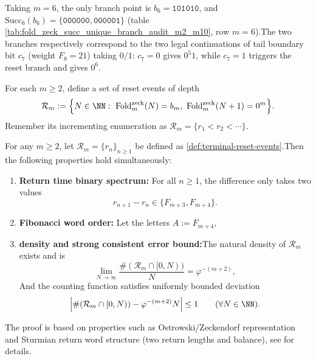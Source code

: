 \begin{enumerate}
\begin{remark}\label{rem:terminal-succ-m6-specialization}Taking \(m=6\), the only branch point is \(b_6=\texttt{101010}\), and\(\mathrm{Succ}_6(b_6)=\{\texttt{000000},\texttt{000001}\}\) (table \ref{tab:fold_zeck_succ_unique_branch_audit_m2_m10}, row \(m=6\)).The two branches respectively correspond to the two legal continuations of tail boundary bit \(c_7\) (weight \(F_8=21\)) taking \(0/1\): \(c_7=0\) gives \(0^{5}1\), while \(c_7=1\) triggers the reset branch and gives \(0^6\).  \end{remark}

\begin{definition}\label{def:terminal-reset-events}For each \(m\ge 2\), define a set of reset events of depth  \[
  \mathcal R_m
  :=\Bigl\{
  N\in\NN:\ \mathrm{Fold}^{\mathrm{zeck}}_m(N)=b_m,\ \mathrm{Fold}^{\mathrm{zeck}}_m(N+1)=0^m
  \Bigr\}.
  \]
Remember its incrementing enumeration as \(\mathcal R_m=\{r_1<r_2<\cdots\}\).  \end{definition}

\begin{theorem}\label{thm:terminal-reset-events-sturmian}For any \(m\ge 2\), let \(\mathcal R_m=\{r_n\}_{n\ge 1}\) be defined as \ref{def:terminal-reset-events}.Then the following properties hold simultaneously:  \begin{enumerate}
\item \textbf{Return time binary spectrum:} For all \(n\ge 1\), the difference only takes two values    \[
    r_{n+1}-r_n\in\{F_{m+3},F_{m+4}\}.
    \]
\item \textbf{Fibonacci word order:} Let the letters \(A:=F_{m+4}\),\item \textbf{density and strong consistent error bound:}The natural density of \(\mathcal R_m\) exists and is    \[
    \lim_{N\to\infty}\frac{\#(\mathcal R_m\cap[0,N))}{N}=\varphi^{-(m+2)},
    \]
And the counting function satisfies uniformly bounded deviation    \[
    \Bigl|\#(\mathcal R_m\cap[0,N))-\varphi^{-(m+2)}N\Bigr|\le 1\qquad(\forall N\in\NN).
    \]
  \end{enumerate}
The proof is based on properties such as Ostrowski/Zeckendorf representation and Sturmian return word structure (two return lengths and balance), see \cite{MorseHedlund1940,LindMarcus1995,Slater1950DistributionIntegers,Slater1967GapsSteps} for details.  \end{theorem}
  
  


\end{enumerate}
